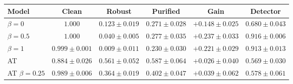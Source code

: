 \begin{tabular}{lccccc}
\toprule
Model & Clean & Robust & Purified & Gain & Detector \\
\midrule
$\beta=0$ & $\mathbf{1.000}$ & $0.123 \pm 0.019$ & $0.271 \pm 0.028$ & $+0.148 \pm 0.025$ & $0.680 \pm 0.043$ \\
$\beta=0.5$ & $\mathbf{1.000}$ & $0.040 \pm 0.005$ & $0.277 \pm 0.035$ & $\mathbf{+0.237 \pm 0.033}$ & $\mathbf{0.916 \pm 0.006}$ \\
$\beta=1$ & $0.999 \pm 0.001$ & $0.009 \pm 0.011$ & $0.230 \pm 0.030$ & $+0.221 \pm 0.029$ & $0.913 \pm 0.013$ \\
AT & $0.884 \pm 0.026$ & $\mathbf{0.561 \pm 0.052}$ & $\mathbf{0.587 \pm 0.064}$ & $+0.026 \pm 0.040$ & $0.569 \pm 0.030$ \\
AT $\beta=0.25$ & $0.989 \pm 0.006$ & $0.364 \pm 0.019$ & $0.402 \pm 0.047$ & $+0.039 \pm 0.062$ & $0.578 \pm 0.061$ \\
\bottomrule
\end{tabular}
